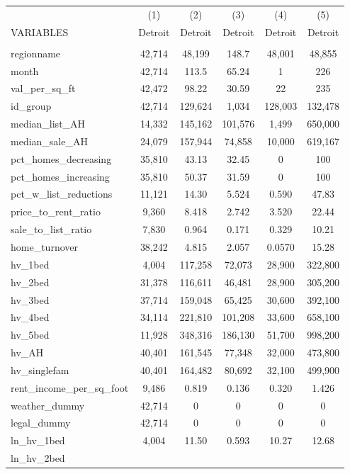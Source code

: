 \begin{tabular}{lccccc} \hline
 & (1) & (2) & (3) & (4) & (5) \\
VARIABLES & Detroit & Detroit & Detroit & Detroit & Detroit \\ \hline
 &  &  &  &  &  \\
regionname & 42,714 & 48,199 & 148.7 & 48,001 & 48,855 \\
month & 42,714 & 113.5 & 65.24 & 1 & 226 \\
val\_per\_sq\_ft & 42,472 & 98.22 & 30.59 & 22 & 235 \\
id\_group & 42,714 & 129,624 & 1,034 & 128,003 & 132,478 \\
median\_list\_AH & 14,332 & 145,162 & 101,576 & 1,499 & 650,000 \\
median\_sale\_AH & 24,079 & 157,944 & 74,858 & 10,000 & 619,167 \\
pct\_homes\_decreasing & 35,810 & 43.13 & 32.45 & 0 & 100 \\
pct\_homes\_increasing & 35,810 & 50.37 & 31.59 & 0 & 100 \\
pct\_w\_list\_reductions & 11,121 & 14.30 & 5.524 & 0.590 & 47.83 \\
price\_to\_rent\_ratio & 9,360 & 8.418 & 2.742 & 3.520 & 22.44 \\
sale\_to\_list\_ratio & 7,830 & 0.964 & 0.171 & 0.329 & 10.21 \\
home\_turnover & 38,242 & 4.815 & 2.057 & 0.0570 & 15.28 \\
hv\_1bed & 4,004 & 117,258 & 72,073 & 28,900 & 322,800 \\
hv\_2bed & 31,378 & 116,611 & 46,481 & 28,900 & 305,200 \\
hv\_3bed & 37,714 & 159,048 & 65,425 & 30,600 & 392,100 \\
hv\_4bed & 34,114 & 221,810 & 101,208 & 33,600 & 658,100 \\
hv\_5bed & 11,928 & 348,316 & 186,130 & 51,700 & 998,200 \\
hv\_AH & 40,401 & 161,545 & 77,348 & 32,000 & 473,800 \\
hv\_singlefam & 40,401 & 164,482 & 80,692 & 32,100 & 499,900 \\
rent\_income\_per\_sq\_foot & 9,486 & 0.819 & 0.136 & 0.320 & 1.426 \\
weather\_dummy & 42,714 & 0 & 0 & 0 & 0 \\
legal\_dummy & 42,714 & 0 & 0 & 0 & 0 \\
ln\_hv\_1bed & 4,004 & 11.50 & 0.593 & 10.27 & 12.68 \\
ln\_hv\_2bed 

\end{tabular}
